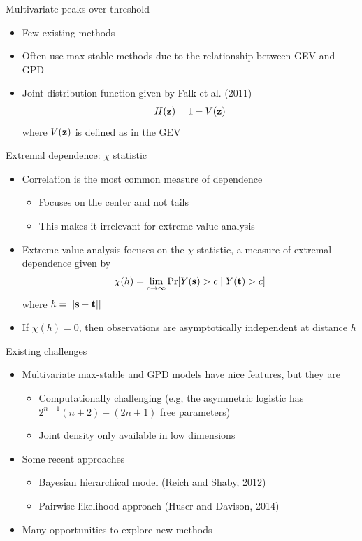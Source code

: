 \documentclass{beamer}
\begin{document}
\begin{frame}{Multivariate peaks over threshold}
  \begin{itemize} \setlength{\itemsep}{1em}
    \item Few existing methods
    \item Often use max-stable methods due to the relationship between GEV and GPD
    \item Joint distribution function given by Falk et al. (2011)
    \begin{align*}
      H(\mbox{\bf z}) = 1 - V(\mbox{\bf z})
    \end{align*}
    where $V(\mbox{\bf z})$ is defined as in the GEV
  \end{itemize}
\end{frame}

\begin{frame}{Extremal dependence: $\chi$ statistic}
  \begin{itemize} \setlength{\itemsep}{1em}
    \item Correlation is the most common measure of dependence
    \begin{itemize}
      \item Focuses on the center and not tails
      \item This makes it irrelevant for extreme value analysis
    \end{itemize}
    \item Extreme value analysis focuses on the $\chi$ statistic, a measure of extremal dependence given by
    \begin{align*}
      \chi(h) = \lim_{c \rightarrow \infty}\Pr[Y(\mbox{\bf s}) > c \mid Y(\mbox{\bf t}) > c]
    \end{align*}
    where $h = ||\mbox{\bf s} - \mbox{\bf t}||$
    \item If $ \chi(h) = 0$, then observations are asymptotically independent at distance $h$
  \end{itemize}
\end{frame}

\begin{frame}{Existing challenges}
  \begin{itemize} \setlength{\itemsep}{1em}
    \item Multivariate max-stable and GPD models have nice features, but they are
    \begin{itemize}
      \item Computationally challenging (e.g,  the asymmetric logistic has $2^{n-1}(n + 2) - (2n + 1)$ free parameters)
      \item Joint density only available in low dimensions
    \end{itemize}
    \item Some recent approaches
    \begin{itemize}
      \item Bayesian hierarchical model (Reich and Shaby, 2012)
      \item Pairwise likelihood approach (Huser and Davison, 2014)
    \end{itemize}
    \item Many opportunities to explore new methods
  \end{itemize}
\end{frame}
\end{document}
